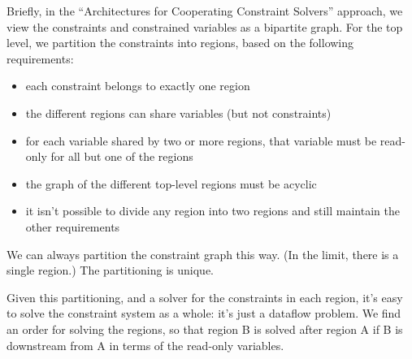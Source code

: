 Briefly, in the ``Architectures for Cooperating Constraint Solvers''
approach, we view the constraints and constrained variables as a
bipartite graph.  For the top level, we partition the constraints into
regions, based on the following requirements:
\begin{itemize}
\item each constraint belongs to exactly one region
\item the different regions can share variables (but not constraints)
\item for each variable shared by two or more regions, that variable
  must be read-only for all but one of the regions
\item the graph of the different top-level regions must be acyclic
\item it isn't possible to divide any region into two regions and
  still maintain the other requirements
\end{itemize}

We can always partition the constraint graph this way.  (In the limit,
there is a single region.)  The partitioning is unique.

Given this partitioning, and a solver for the constraints in each
region, it's easy to solve the constraint system as a whole: it's just
a dataflow problem.  We find an order for solving the regions, so that
region B is solved after region A if B is downstream from A in terms
of the read-only variables.




